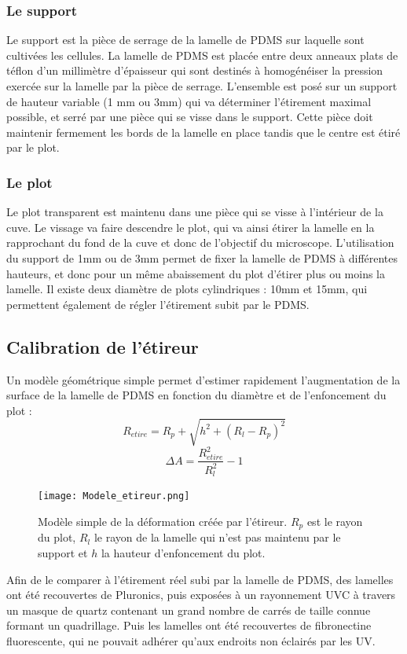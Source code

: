 		
	\subsubsection{Le support}
	Le support est la pièce de serrage de la lamelle de PDMS sur laquelle sont cultivées les cellules. La lamelle de PDMS est placée entre deux anneaux plats de téflon d'un millimètre d'épaisseur qui sont destinés à homogénéiser la pression exercée sur la lamelle par la pièce de serrage. L'ensemble est posé sur un support de hauteur variable (1 mm ou 3mm) qui va déterminer l'étirement maximal possible, et serré par une pièce qui se visse dans le support. 
	Cette pièce doit maintenir fermement les bords de la lamelle en place tandis que le centre est étiré par le plot. 
	\subsubsection{Le plot}
	Le plot transparent est maintenu dans une pièce qui se visse à l'intérieur de la cuve. Le vissage va faire descendre le plot, qui va ainsi étirer la lamelle en la rapprochant du fond de la cuve et donc de l'objectif du microscope. 
	L'utilisation du support de 1mm ou de 3mm permet de fixer la lamelle de PDMS à différentes hauteurs, et donc pour un même abaissement du plot d'étirer plus ou moins la lamelle. Il existe deux diamètre de plots cylindriques : 10mm et 15mm, qui permettent également de régler l'étirement subit par le PDMS. 
	\subsection{Calibration de l'étireur}
	
	Un modèle géométrique simple permet d'estimer rapidement l'augmentation de la surface de la lamelle de PDMS en fonction du diamètre et de l'enfoncement du plot : 
	$$R_{etire}=R_p+\sqrt{h^2+(R_l-R_p)^2}$$
	$$ \Delta A = \frac{R_{etire}^2}{R_l^2}-1$$ 	
		
	\begin{figure}[h!]
		\texttt{[image: Modele\_etireur.png]}
		\caption{Modèle simple de la déformation créée par l'étireur. $R_p$ est le rayon du plot, $R_l$ le rayon de la lamelle qui n'est pas maintenu par le support et $h$ la hauteur d'enfoncement du plot.}
		\end{figure}	
	Afin de le comparer à l'étirement réel subi par la lamelle de PDMS, des lamelles ont été recouvertes de Pluronics, puis exposées à un rayonnement UVC à travers un masque de quartz contenant un grand nombre de carrés de taille connue formant un quadrillage. Puis les lamelles ont été recouvertes de fibronectine fluorescente, qui ne pouvait adhérer qu'aux endroits non éclairés par les UV. 
	
